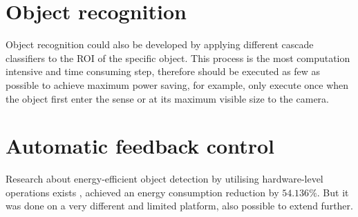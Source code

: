 \section{Object recognition}

Object recognition could also be developed by applying different cascade classifiers to the ROI of the specific object. This process is the most computation intensive and time consuming step, therefore should be executed as few as possible to achieve maximum power saving, for example, only execute once when the object first enter the sense or at its maximum visible size to the camera.

\section{Automatic feedback control}

Research about energy-efficient object detection by utilising hardware-level operations exists \cite{casares2011energy}, achieved an energy consumption reduction by $54.136\%$. But it was done on a very different and limited platform, also possible to extend further.
